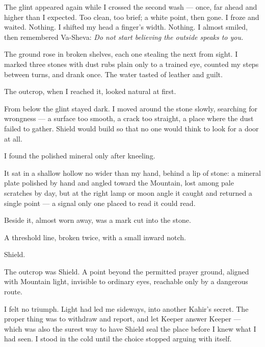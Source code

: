 The glint appeared again while I crossed the second wash --- once, far ahead and higher than I expected. Too clean, too brief; a white point, then gone. I froze and waited. Nothing. I shifted my head a finger's width. Nothing. I almost smiled, then remembered Va-Sheva: \textit{Do not start believing the outside speaks to you.}\par

The ground rose in broken shelves, each one stealing the next from sight. I marked three stones with dust rubs plain only to a trained eye, counted my steps between turns, and drank once. The water tasted of leather and guilt.\par

The outcrop, when I reached it, looked natural at first.\par

From below the glint stayed dark. I moved around the stone slowly, searching for wrongness --- a surface too smooth, a crack too straight, a place where the dust failed to gather. Shield would build so that no one would think to look for a door at all.\par

I found the polished mineral only after kneeling.\par

It sat in a shallow hollow no wider than my hand, behind a lip of stone: a mineral plate polished by hand and angled toward the Mountain, lost among pale scratches by day, but at the right lamp or moon angle it caught and returned a single point --- a signal only one placed to read it could read.\par

Beside it, almost worn away, was a mark cut into the stone.\par

A threshold line, broken twice, with a small inward notch.\par

Shield.\par

The outcrop was Shield. A point beyond the permitted prayer ground, aligned with Mountain light, invisible to ordinary eyes, reachable only by a dangerous route.\par

I felt no triumph. Light had led me sideways, into another Kahir's secret. The proper thing was to withdraw and report, and let Keeper answer Keeper --- which was also the surest way to have Shield seal the place before I knew what I had seen. I stood in the cold until the choice stopped arguing with itself.\par

